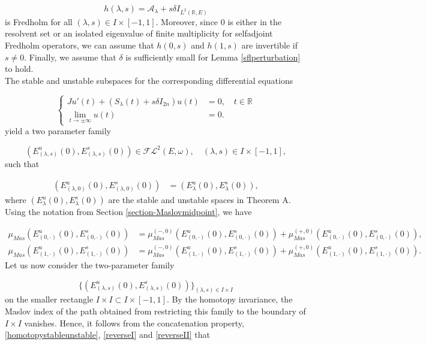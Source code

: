 \documentclass[a4paper,10pt]{article}
\begin{document}
\[h(\lambda,s)=\mathcal{A}_\lambda+s\delta I_{L^2(\mathbb{R},E)}\]
is Fredholm for all $(\lambda,s)\in I\times[-1,1]$. Moreover, since $0$ is either in the resolvent set or an isolated eigenvalue of finite multiplicity for selfadjoint Fredholm operators, we can assume that $h(0,s)$ and $h(1,s)$ are invertible if $s\neq 0$. Finally, we assume that $\delta$ is sufficiently small for Lemma \ref{sflperturbation} to hold.\\
The stable and unstable subspaces for the corresponding differential equations

\begin{equation*}
\left\{
\begin{aligned}
Ju'(t)+(S_\lambda(t)+s\delta I_{2n})u(t)&=0,\quad t\in\mathbb{R}\\
\lim_{t\rightarrow\pm\infty}u(t)&=0.
\end{aligned}
\right.
\end{equation*}
yield a two parameter family 

\[(E^u_{(\lambda,s)}(0),E^s_{(\lambda,s)}(0))\in\mathcal{FL}^2(E,\omega),\quad (\lambda,s)\in I\times [-1,1],\]
such that

\begin{align}\label{homotopystableunstable}
(E^u_{(\lambda,0)}(0),E^s_{(\lambda,0)}(0))&=(E^u_\lambda(0),E^s_\lambda(0)),
\end{align}
where $(E^u_\lambda(0),E^s_\lambda(0))$ are the stable and unstable spaces in Theorem A. Using the notation from Section \ref{section-Maslovmidpoint}, we have

\begin{align*}
\mu_{Mas}(E^u_{(0,\cdot)}(0),E^s_{(0,\cdot)}(0))&=\mu^{(-,0)}_{Mas}(E^u_{(0,\cdot)}(0),E^s_{(0,\cdot)}(0))+\mu^{(+,0)}_{Mas}(E^u_{(0,\cdot)}(0),E^s_{(0,\cdot)}(0)),\\
\mu_{Mas}(E^u_{(1,\cdot)}(0),E^s_{(1,\cdot)}(0))&=\mu^{(-,0)}_{Mas}(E^u_{(1,\cdot)}(0),E^s_{(1,\cdot)}(0))+\mu^{(+,0)}_{Mas}(E^u_{(1,\cdot)}(0),E^s_{(1,\cdot)}(0)).
\end{align*}
Let us now consider the two-parameter family 

\[\{(E^u_{(\lambda,s)}(0),E^s_{(\lambda,s)}(0))\}_{(\lambda,s)\in I\times I}\]
on the smaller rectangle $I\times I\subset I\times[-1,1]$. By the homotopy invariance, the Maslov index of the path obtained from restricting this family to the boundary of $I\times I$ vanishes. Hence, it follows from the concatenation property, \eqref{homotopystableunstable}, \eqref{reverseI} and \eqref{reverseII} that
\end{document}
